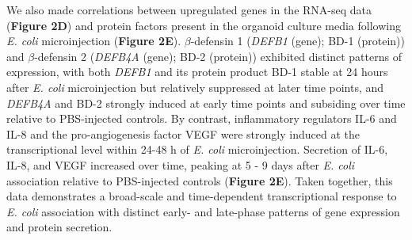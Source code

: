 \documentclass[9pt,lineo]{elife}
\begin{document}
We also made correlations between upregulated genes in the RNA-seq data (\textbf{Figure 2D}) and protein factors present in the organoid culture media following \emph{E. coli} microinjection (\textbf{Figure 2E}). \(\beta\)-defensin 1 (\emph{DEFB1} (gene); BD-1 (protein)) and \(\beta\)-defensin 2 (\emph{DEFB4A} (gene); BD-2 (protein)) exhibited distinct patterns of expression, with both \emph{DEFB1} and its protein product BD-1 stable at 24 hours after \emph{E. coli} microinjection but relatively suppressed at later time points, and \emph{DEFB4A} and BD-2 strongly induced at early time points and subsiding over time relative to PBS-injected controls. By contrast, inflammatory regulators IL-6 and IL-8 and the pro-angiogenesis factor VEGF were strongly induced at the transcriptional level within 24-48 h of \emph{E. coli} microinjection. Secretion of IL-6, IL-8, and VEGF increased over time, peaking at 5 - 9 days after \emph{E. coli} association relative to PBS-injected controls (\textbf{Figure 2E}). Taken together, this data demonstrates a broad-scale and time-dependent transcriptional response to \emph{E. coli} association with distinct early- and late-phase patterns of gene expression and protein secretion.
\end{document}
